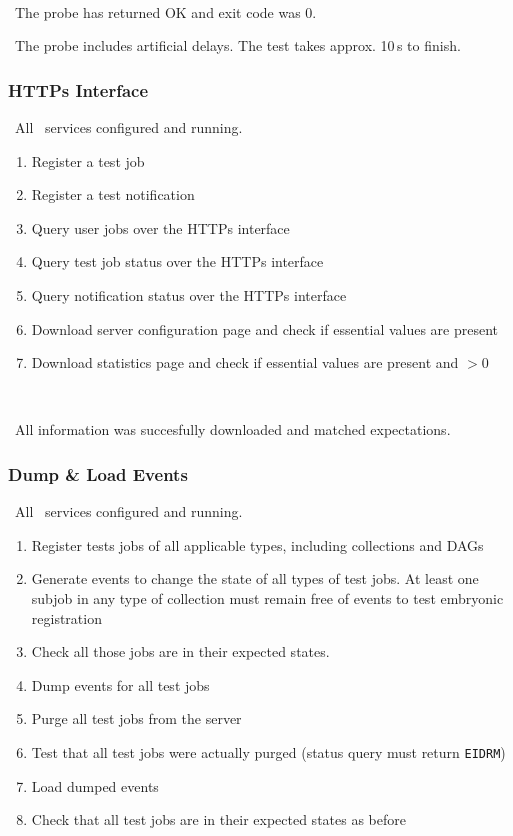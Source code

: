 \how\ 

\result\ The probe has returned OK and exit code was 0.

\note\ The probe includes artificial delays. The test takes approx. 10\,s to finish.

\subsubsection{HTTPs Interface}
\label{permissions}
\req\ All \LB\ services configured and running.

\what
\begin{enumerate}
\item Register a test job
\item Register a test notification
\item Query user jobs over the HTTPs interface
\item Query test job status over the HTTPs interface
\item Query notification status over the HTTPs interface
\item Download server configuration page and check if essential values are present
\item Download statistics page and check if essential values are present and $> 0$
\end{enumerate}

\how\ 

\result\ All information was succesfully downloaded and matched expectations.

\subsubsection{Dump \& Load Events}
\label{dumpload}
\req\ All \LB\ services configured and running.

\what
\begin{enumerate}
\item Register tests jobs of all applicable types, including collections and DAGs
\item Generate events to change the state of all types of test jobs. At least one subjob in any type of collection must remain free of events to test embryonic registration
\item Check all those jobs are in their expected states.
\item Dump events for all test jobs
\item Purge all test jobs from the \LB server
\item Test that all test jobs were actually purged (status query must return \texttt{EIDRM})
\item Load dumped events
\item Check that all test jobs are in their expected states as before
\end{enumerate}

